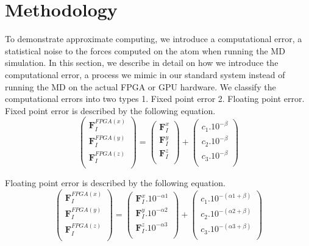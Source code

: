 \documentclass[aps,pre,twocolumn,showpacs,preprintnumbers,amsmath,amssymb]{revtex4-1}
\begin{document}
\section{Methodology}
To demonstrate approximate computing, we introduce a computational error, a statistical noise to the forces computed on the atom when running the MD simulation. In this section, we describe in detail on how we introduce the computational error, a process we mimic in our standard system instead of running the MD on the actual FPGA or GPU hardware. We classify the computational errors into two types 1. Fixed point error 2. Floating point error. 
Fixed point error is described by the following equation. 
\begin{equation}
\begin{pmatrix}
\textbf{F}_{I}^{FPGA(x)}\\ 
\textbf{F}_{I}^{FPGA(y)}\\ 
\textbf{F}_{I}^{FPGA(z)}\\ 

\end{pmatrix} = 
\begin{pmatrix}
\textbf{F}_{I}^{x}\\ 
\textbf{F}_{I}^{y}\\ 
\textbf{F}_{I}^{z}\\ 

\end{pmatrix} + 
\begin{pmatrix}
c_{1}.10^{-\beta }\\ 
c_{2}.10^{-\beta }\\ 
c_{3}.10^{-\beta }\\ 

\end{pmatrix}
\end{equation}
 
Floating point error is described by the following equation.
\begin{equation}
\begin{pmatrix}
\textbf{F}_{I}^{FPGA(x)}\\ 
\textbf{F}_{I}^{FPGA(y)}\\ 
\textbf{F}_{I}^{FPGA(z)}\\ 

\end{pmatrix} = 
\begin{pmatrix}
\textbf{F}_{I}^{x}.10^{-\alpha1}\\ 
\textbf{F}_{I}^{y}.10^{-\alpha2}\\ 
\textbf{F}_{I}^{z}.10^{-\alpha3}\\ 

\end{pmatrix} + 
\begin{pmatrix}
c_{1}.10^{-(\alpha1+\beta)}\\ 
c_{2}.10^{-(\alpha2+\beta)}\\ 
c_{3}.10^{-(\alpha3+\beta)}\\ 

\end{pmatrix}
\end{equation}
\end{document}
